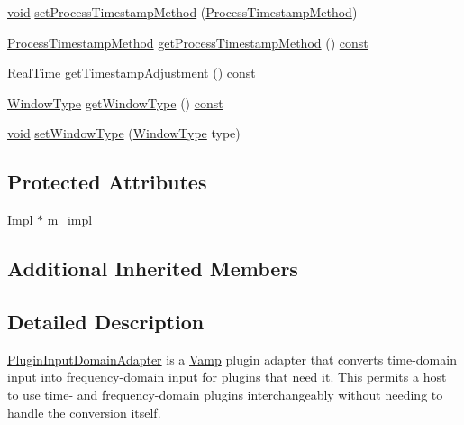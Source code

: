 \begin{DoxyCompactItemize}
\hyperlink{sound_8c_ae35f5844602719cf66324f4de2a658b3}{void} \hyperlink{class_vamp_1_1_host_ext_1_1_plugin_input_domain_adapter_a1d7366f8cab39abc01ebfc7bf7ca8089}{set\+Process\+Timestamp\+Method} (\hyperlink{class_vamp_1_1_host_ext_1_1_plugin_input_domain_adapter_a2518e4922d77bc4e514d84cec9a0b577}{Process\+Timestamp\+Method})
\item 
\hyperlink{class_vamp_1_1_host_ext_1_1_plugin_input_domain_adapter_a2518e4922d77bc4e514d84cec9a0b577}{Process\+Timestamp\+Method} \hyperlink{class_vamp_1_1_host_ext_1_1_plugin_input_domain_adapter_a091560e10d7c242708b5a49f7d1ed8db}{get\+Process\+Timestamp\+Method} () \hyperlink{getopt1_8c_a2c212835823e3c54a8ab6d95c652660e}{const} 
\item 
\hyperlink{struct_vamp_1_1_real_time}{Real\+Time} \hyperlink{class_vamp_1_1_host_ext_1_1_plugin_input_domain_adapter_ac1ab6af0fcda0a4c3f050c54b2db4769}{get\+Timestamp\+Adjustment} () \hyperlink{getopt1_8c_a2c212835823e3c54a8ab6d95c652660e}{const} 
\item 
\hyperlink{class_vamp_1_1_host_ext_1_1_plugin_input_domain_adapter_a27e6a7c3f93f1618836792b588b767dc}{Window\+Type} \hyperlink{class_vamp_1_1_host_ext_1_1_plugin_input_domain_adapter_a6559c5dc5da37dbf84f1df3e5fea2a77}{get\+Window\+Type} () \hyperlink{getopt1_8c_a2c212835823e3c54a8ab6d95c652660e}{const} 
\item 
\hyperlink{sound_8c_ae35f5844602719cf66324f4de2a658b3}{void} \hyperlink{class_vamp_1_1_host_ext_1_1_plugin_input_domain_adapter_a652bf9f25352a4fa89dd80ff816558d4}{set\+Window\+Type} (\hyperlink{class_vamp_1_1_host_ext_1_1_plugin_input_domain_adapter_a27e6a7c3f93f1618836792b588b767dc}{Window\+Type} type)
\end{DoxyCompactItemize}
\subsection*{Protected Attributes}
\begin{DoxyCompactItemize}
\item 
\hyperlink{class_vamp_1_1_host_ext_1_1_plugin_input_domain_adapter_1_1_impl}{Impl} $\ast$ \hyperlink{class_vamp_1_1_host_ext_1_1_plugin_input_domain_adapter_a9fa8a6b8a4e41b6e3f2fabc0d23678cc}{m\+\_\+impl}
\end{DoxyCompactItemize}
\subsection*{Additional Inherited Members}


\subsection{Detailed Description}
\hyperlink{class_vamp_1_1_host_ext_1_1_plugin_input_domain_adapter}{Plugin\+Input\+Domain\+Adapter} is a \hyperlink{namespace_vamp}{Vamp} plugin adapter that converts time-\/domain input into frequency-\/domain input for plugins that need it. This permits a host to use time-\/ and frequency-\/domain plugins interchangeably without needing to handle the conversion itself.

